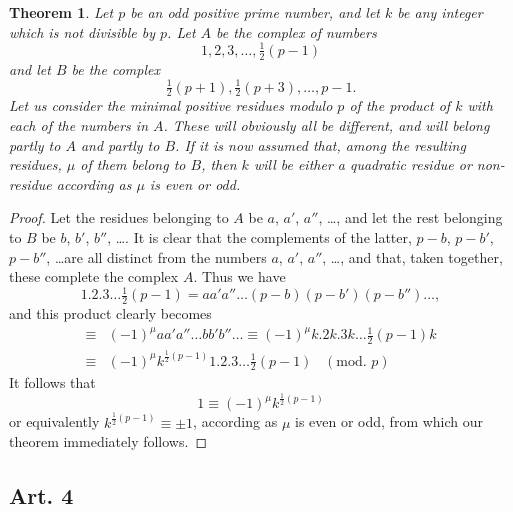 \documentclass{book}
\theoremstyle{plain}
\newtheorem*{theorem}{Theorem}
\theoremstyle{remark}
\begin{document}
\begin{theorem} Let $p$ be an odd positive prime number, and let $k$ be any integer which is not divisible by $p$.  Let $A$ be the complex of numbers 
\[ 1, 2, 3, \dots, \tfrac{1}{2}(p-1) \]
and let $B$ be the complex 
\[ \tfrac{1}{2}(p+1), \tfrac{1}{2}(p+3),\dots, p-1. \]
Let us consider the minimal positive residues modulo $p$ of the product of $k$ with each of the numbers in $A$.  These will obviously all be different, and will belong partly to $A$ and partly to $B$.  If it is now assumed that, among the resulting residues, $\mu$ of them belong to $B$, then $k$ will be either a quadratic residue or non-residue according as $\mu$ is even or odd.\end{theorem}
\begin{proof} Let the residues belonging to $A$ be $a$, $a'$, $a''$, \dots, and let the rest belonging to $B$ be $b$, $b'$, $b''$, \dots.  It is clear that the complements of the latter, $p-b$, $p-b'$, $p-b''$, \dots are all distinct from the numbers $a$, $a'$, $a''$, \dots, and that, taken together, these complete the complex $A$.  Thus we have 
\[ 1.2.3\dots\tfrac{1}{2}(p-1) = a a' a'' \dots (p-b)(p-b')(p-b'') \dots, \]
and this product clearly becomes
\begin{align*} \equiv& (-1)^{\mu} aa'a''\dots b b' b'' \dots \equiv (-1)^\mu k . 2k .3k\dots \tfrac{1}{2}(p-1)k \\
\equiv& (-1)^\mu k^{\frac{1}{2}(p-1)} 1 . 2 . 3 \dots \tfrac{1}{2}(p-1) \; \;\;(\textrm{mod. }p)  \end{align*}
It follows that 
\[ 1 \equiv (-1)^{\mu} k^{\frac{1}{2}(p-1)} \]
or equivalently $k^{\frac{1}{2}(p-1)} \equiv \pm 1$, according as $\mu$ is even or odd, from which our theorem immediately follows.
\end{proof}

\subsection*{Art. 4} 
\end{document}
